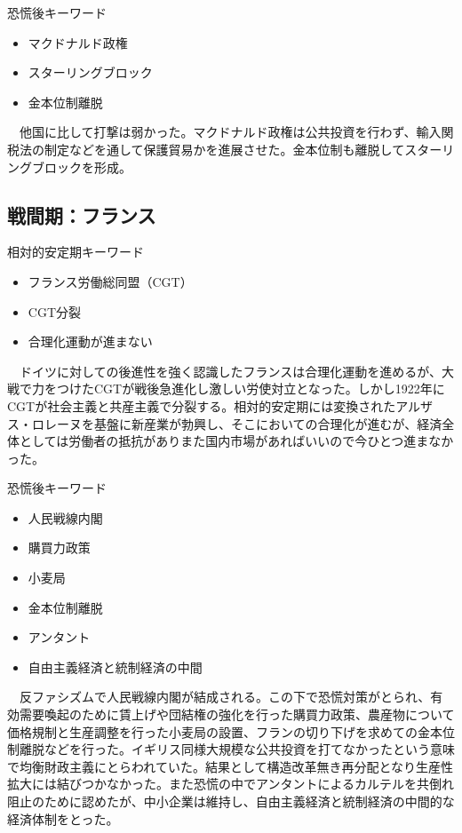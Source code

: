 \documentclass{jsarticle}
\begin{document}
恐慌後キーワード
\begin{itemize}
\item マクドナルド政権
\item スターリングブロック
\item 金本位制離脱
\end{itemize}
　他国に比して打撃は弱かった。マクドナルド政権は公共投資を行わず、輸入関税法の制定などを通して保護貿易かを進展させた。金本位制も離脱してスターリングブロックを形成。

\subsection{戦間期：フランス}
相対的安定期キーワード
\begin{itemize}
\item フランス労働総同盟（CGT）
\item CGT分裂
\item 合理化運動が進まない
\end{itemize}
　ドイツに対しての後進性を強く認識したフランスは合理化運動を進めるが、大戦で力をつけたCGTが戦後急進化し激しい労使対立となった。しかし1922年にCGTが社会主義と共産主義で分裂する。相対的安定期には変換されたアルザス・ロレーヌを基盤に新産業が勃興し、そこにおいての合理化が進むが、経済全体としては労働者の抵抗がありまた国内市場があればいいので今ひとつ進まなかった。

恐慌後キーワード
\begin{itemize}
\item 人民戦線内閣
\item 購買力政策
\item 小麦局
\item 金本位制離脱
\item アンタント
\item 自由主義経済と統制経済の中間
\end{itemize}
　反ファシズムで人民戦線内閣が結成される。この下で恐慌対策がとられ、有効需要喚起のために賃上げや団結権の強化を行った購買力政策、農産物について価格規制と生産調整を行った小麦局の設置、フランの切り下げを求めての金本位制離脱などを行った。イギリス同様大規模な公共投資を打てなかったという意味で均衡財政主義にとらわれていた。結果として構造改革無き再分配となり生産性拡大には結びつかなかった。また恐慌の中でアンタントによるカルテルを共倒れ阻止のために認めたが、中小企業は維持し、自由主義経済と統制経済の中間的な経済体制をとった。
\end{document}
